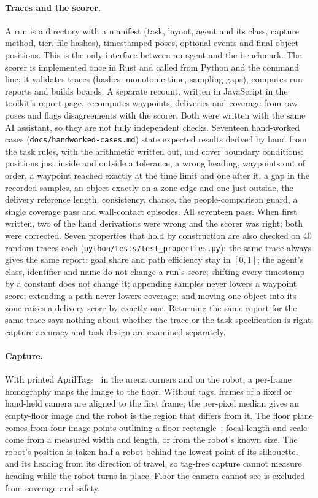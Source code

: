 \documentclass[11pt]{article}
\begin{document}
\paragraph{Traces and the scorer.} A run is a directory with a manifest (task, layout, agent and its
class, capture method, tier, file hashes), timestamped poses, optional events and final object
positions. This is the only interface between an agent and the benchmark. The scorer is implemented
once in Rust and called from Python and the command line; it validates traces (hashes, monotonic time,
sampling gaps), computes run reports and builds boards. A separate recount, written in JavaScript in
the toolkit's report page, recomputes waypoints, deliveries and coverage from raw poses and flags
disagreements with the scorer. Both were written with the same AI assistant, so they are not fully
independent checks. Seventeen hand-worked cases (\texttt{docs/handworked-cases.md}) state expected
results derived by hand from the task rules, with the arithmetic written out, and cover boundary
conditions: positions just inside and outside a tolerance, a wrong heading, waypoints out of order, a
waypoint reached exactly at the time limit and one after it, a gap in the recorded samples, an object
exactly on a zone edge and one just outside, the delivery reference length, consistency, chance, the
people-comparison guard, a single coverage pass and wall-contact episodes. All seventeen pass. When
first written, two of the hand derivations were wrong and the scorer was right; both were corrected.
Seven properties that hold by construction are also checked on 40 random traces each
(\texttt{python/tests/test\_properties.py}): the same trace always gives the same report; goal share and
path efficiency stay in $[0,1]$; the agent's class, identifier and name do not change a run's score;
shifting every timestamp by a constant does not change it; appending samples never lowers a waypoint
score; extending a path never lowers coverage; and moving one object into its zone raises a delivery
score by exactly one. Returning the same report for the same trace says nothing about whether the
trace or the task specification is right; capture accuracy and task design are examined separately.

\paragraph{Capture.} With printed AprilTags~\cite{olson2011} in the arena corners and on the robot, a
per-frame homography maps the image to the floor. Without tags, frames of a fixed or hand-held camera
are aligned to the first frame; the per-pixel median gives an empty-floor image and the robot is the
region that differs from it. The floor plane comes from four image points outlining a floor
rectangle~\cite{hartley2004}; focal length and scale come from a measured width and length, or from
the robot's known size. The robot's position is taken half a robot behind the lowest point of its
silhouette, and its heading from its direction of travel, so tag-free capture cannot measure heading
while the robot turns in place. Floor the camera cannot see is excluded from coverage and safety.
\end{document}
